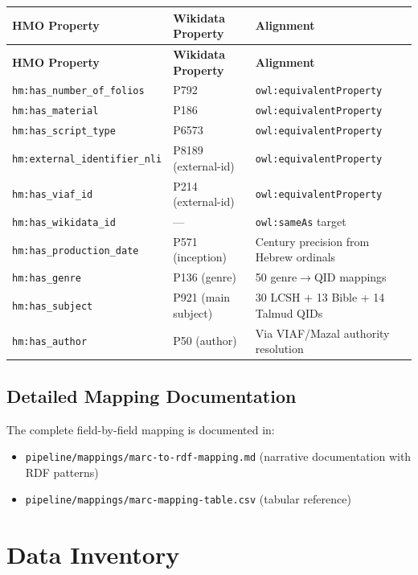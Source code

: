 \documentclass[12pt]{article}
\newcommand{\filepath}[1]{\texttt{\small #1}}
\newcommand{\code}[1]{\texttt{#1}}
\begin{document}
\begin{longtable}{|l|l|l|}
\hline
\textbf{HMO Property} & \textbf{Wikidata Property} & \textbf{Alignment} \\
\hline
\endfirsthead
\hline
\textbf{HMO Property} & \textbf{Wikidata Property} & \textbf{Alignment} \\
\hline
\endhead
\hline
\endfoot
\code{hm:has\_number\_of\_folios} & P792 & \code{owl:equivalentProperty} \\
\hline
\code{hm:has\_material} & P186 & \code{owl:equivalentProperty} \\
\hline
\code{hm:has\_script\_type} & P6573 & \code{owl:equivalentProperty} \\
\hline
\code{hm:external\_identifier\_nli} & P8189 (external-id) & \code{owl:equivalentProperty} \\
\hline
\code{hm:has\_viaf\_id} & P214 (external-id) & \code{owl:equivalentProperty} \\
\hline
\code{hm:has\_wikidata\_id} & --- & \code{owl:sameAs} target \\
\hline
\code{hm:has\_production\_date} & P571 (inception) & Century precision from Hebrew ordinals \\
\hline
\code{hm:has\_genre} & P136 (genre) & 50 genre$\to$QID mappings \\
\hline
\code{hm:has\_subject} & P921 (main subject) & 30 LCSH + 13 Bible + 14 Talmud QIDs \\
\hline
\code{hm:has\_author} & P50 (author) & Via VIAF/Mazal authority resolution \\
\hline
\end{longtable}

\subsection{Detailed Mapping Documentation}

The complete field-by-field mapping is documented in:
\begin{itemize}
\item \filepath{pipeline/mappings/marc-to-rdf-mapping.md} (narrative documentation with RDF patterns)
\item \filepath{pipeline/mappings/marc-mapping-table.csv} (tabular reference)
\end{itemize}


\section{Data Inventory}
\label{sec:inventory}
\end{document}
